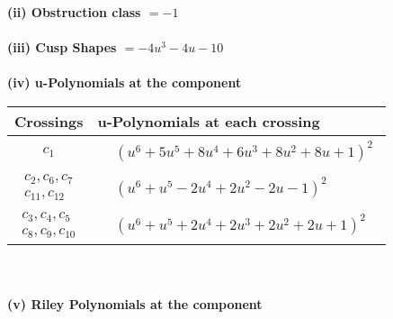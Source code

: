 \documentclass[1p]{elsarticle_modified}
\theoremstyle{definition}
\begin{document}
\flushleft \textbf{(ii) Obstruction class $= -1$}\\~\\
\flushleft \textbf{(iii) Cusp Shapes $= -4 u^3-4 u-10$}\\~\\
\newpage\renewcommand{\arraystretch}{1}
\flushleft \textbf{(iv) u-Polynomials at the component}\newline \\
\begin{tabular}{m{50pt}|m{274pt}}
Crossings & \hspace{64pt}u-Polynomials at each crossing \\
\hline $$\begin{aligned}c_{1}\end{aligned}$$&$\begin{aligned}
&(u^6+5 u^5+8 u^4+6 u^3+8 u^2+8 u+1)^2
\end{aligned}$\\
\hline $$\begin{aligned}c_{2},c_{6},c_{7}\\c_{11},c_{12}\end{aligned}$$&$\begin{aligned}
&(u^6+u^5-2 u^4+2 u^2-2 u-1)^2
\end{aligned}$\\
\hline $$\begin{aligned}c_{3},c_{4},c_{5}\\c_{8},c_{9},c_{10}\end{aligned}$$&$\begin{aligned}
&(u^6+u^5+2 u^4+2 u^3+2 u^2+2 u+1)^2
\end{aligned}$\\
\hline
\end{tabular}\\~\\
\newpage\renewcommand{\arraystretch}{1}
\flushleft \textbf{(v) Riley Polynomials at the component}\newline \\
\end{document}
